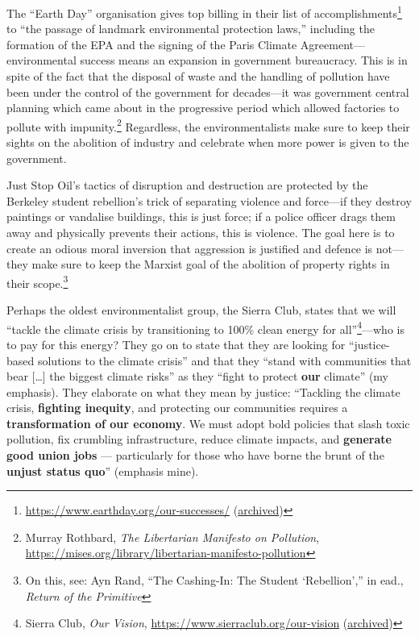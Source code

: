 \documentclass[11pt]{article}
\begin{document}
The ``Earth Day'' organisation gives top billing in their list of accomplishments\footnote{\url{https://www.earthday.org/our-successes/} (\href{https://archive.ph/BfsAu}{archived})} to ``the passage of landmark environmental protection laws,'' including the formation of the EPA and the signing of the Paris Climate Agreement---environmental success means an expansion in government bureaucracy. This is in spite of the fact that the disposal of waste and the handling of pollution have been under the control of the government for decades---it was government central planning which came about in the progressive period which allowed factories to pollute with impunity.\footnote{Murray Rothbard, \emph{The Libertarian Manifesto on Pollution}, \url{https://mises.org/library/libertarian-manifesto-pollution}} Regardless, the environmentalists make sure to keep their sights on the abolition of industry and celebrate when more power is given to the government.

Just Stop Oil's tactics of disruption and destruction are protected by the Berkeley student rebellion's trick of separating violence and force---if they destroy paintings or vandalise buildings, this is just force; if a police officer drags them away and physically prevents their actions, this is violence. The goal here is to create an odious moral inversion that aggression is justified and defence is not---they make sure to keep the Marxist goal of the abolition of property rights in their scope.\footnote{On this, see: Ayn Rand, ``The Cashing-In: The Student `Rebellion','' in ead., \emph{Return of the Primitive}}

Perhaps the oldest environmentalist group, the Sierra Club, states that we will ``tackle the climate crisis by transitioning to 100\% clean energy for all''\footnote{Sierra Club, \emph{Our Vision}, \url{https://www.sierraclub.org/our-vision} (\href{https://archive.ph/cSdQT}{archived})}---who is to pay for this energy? They go on to state that they are looking for ``justice-based solutions to the climate crisis'' and that they ``stand with communities that bear [\ldots{}] the biggest climate risks'' as they ``fight to protect \textbf{our} climate'' (my emphasis). They elaborate on what they mean by justice: ``Tackling the climate crisis, \textbf{fighting inequity}, and protecting our communities requires a \textbf{transformation of our economy}. We must adopt bold policies that slash toxic pollution, fix crumbling infrastructure, reduce climate impacts, and \textbf{generate good union jobs} — particularly for those who have borne the brunt of the \textbf{unjust status quo}'' (emphasis mine).
\end{document}
